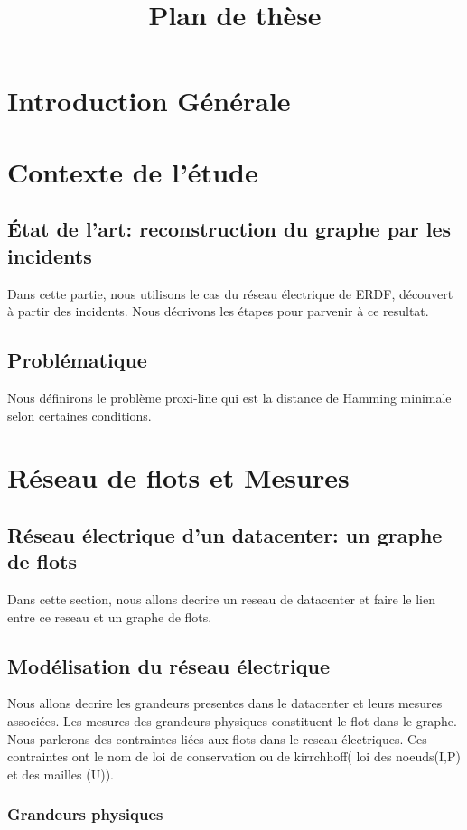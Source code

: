 \documentclass[onecolumn, 12pt]{book}
\title{Plan de th\`ese}
\date{\oldstylenums{\today}}
\begin{document}
\maketitle
\tableofcontents

\chapter{Introduction G\'en\'erale}
\chapter{Contexte de l'\'etude}
	\section{\'Etat de l'art: reconstruction du graphe par les incidents}
	Dans cette partie, nous utilisons le cas du r\'eseau \'electrique de ERDF, d\'ecouvert \`a partir des incidents. Nous d\'ecrivons les \'etapes pour parvenir \`a ce resultat. 
	
	\section{Probl\'ematique}
	Nous d\'efinirons le probl\`eme proxi-line qui est la distance de Hamming minimale selon certaines conditions.
	
\chapter{R\'eseau de flots et Mesures }
	\section{R\'eseau \'electrique d'un datacenter: un graphe de flots}
	Dans cette section, nous allons decrire un reseau de datacenter et faire le lien entre ce reseau et un graphe de flots.
	\section{Mod\'elisation du r\'eseau \'electrique}
	Nous allons decrire les grandeurs presentes dans le datacenter et leurs mesures associ\'ees. 
	Les mesures des grandeurs physiques constituent le flot dans le graphe. 
	Nous parlerons des contraintes li\'ees aux flots dans le reseau \'electriques. Ces contraintes ont le nom de loi de conservation ou de kirrchhoff( loi des noeuds(I,P) et des mailles (U)).
		\subsection{Grandeurs physiques}
\end{document}
